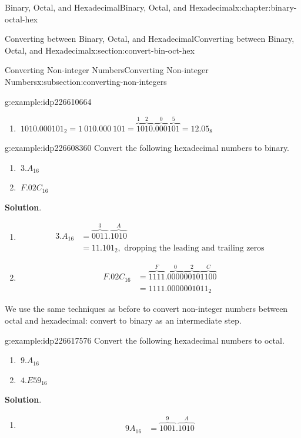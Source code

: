 \documentclass[twoside,10pt,]{book}
\newcommand{\blocktitlefont}{\relax}
\numberwithin{equation}{section}
\newcommand{\amp}{&}
\begin{document}
\begin{chapterptx}{Binary, Octal, and Hexadecimal}{}{Binary, Octal, and Hexadecimal}{}{}{x:chapter:binary-octal-hex}
\begin{sectionptx}{Converting between Binary, Octal, and Hexadecimal}{}{Converting between Binary, Octal, and Hexadecimal}{}{}{x:section:convert-bin-oct-hex}
\begin{subsectionptx}{Converting Non-integer Numbers}{}{Converting Non-integer Numbers}{}{}{x:subsection:converting-non-integers}
\begin{example}{}{g:example:idp226610664}
\begin{enumerate}
\item{}\(\displaystyle \ 1010.000101_2=1\ 010.000\ 101=\overbrace{1}^1\overbrace{010}^2.\overbrace{000}^0\overbrace{101}^5=12.05_8\)%
\end{enumerate}
\end{example}
\begin{example}{}{g:example:idp226608360}%
Convert the following hexadecimal numbers to binary. %
\begin{enumerate}
\item{}\(\displaystyle \ 3.A_{16}\)%
\item{}\(\displaystyle \ F.02C_{16}\)%
\end{enumerate}
\par\smallskip%
\noindent\textbf{\blocktitlefont Solution}.\label{g:solution:idp226617704}{}\hypertarget{g:solution:idp226617704}{}\quad{}%
\begin{enumerate}
\item{}%
\begin{align*}
3.A_{16} \amp = \overbrace{0011}^3.\overbrace{1010}^A\\
\amp = 11.101_2,\text{ dropping the leading and trailing zeros}
\end{align*}
%
\item{}%
\begin{align*}
F.02C_{16} \amp = \overbrace{1111}^F.\overbrace{0000}^0\overbrace{0010}^2\overbrace{1100}^C\\
\amp = 1111.0000 0010 11_2
\end{align*}
%
\end{enumerate}
\end{example}
We use the same techniques as before to convert non-integer numbers between octal and hexadecimal: convert to binary as an intermediate step.%
\begin{example}{}{g:example:idp226617576}%
Convert the following hexadecimal numbers to octal. %
\begin{enumerate}
\item{}\(\displaystyle \ 9.A_{16}\)%
\item{}\(\displaystyle \ 4.E59_{16}\)%
\end{enumerate}
\par\smallskip%
\noindent\textbf{\blocktitlefont Solution}.\label{g:solution:idp226621160}{}\hypertarget{g:solution:idp226621160}{}\quad{}%
\begin{enumerate}
\item{}%
\begin{align*}
9A_{16} \amp = \overbrace{1001}^9.\overbrace{1010}^A\\

\end{align*}
\end{enumerate}
\end{example}
\end{subsectionptx}
\end{sectionptx}
\end{chapterptx}
\end{document}
